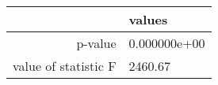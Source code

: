 \begin{tabular}{|r|l|}
  \hline
    & values \\
  \hline
  p-value & 0.000000e+00 \\
  \hline
  value of statistic F & 2460.67 \\
  \hline
\end{tabular}

